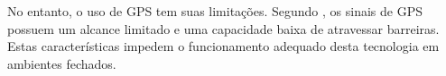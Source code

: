 No entanto, o uso de GPS tem suas limitações. Segundo \citet{sukaphat2013}, os sinais de GPS possuem um alcance limitado e uma capacidade baixa de atravessar barreiras. Estas características impedem o funcionamento adequado desta tecnologia em ambientes fechados. \par

